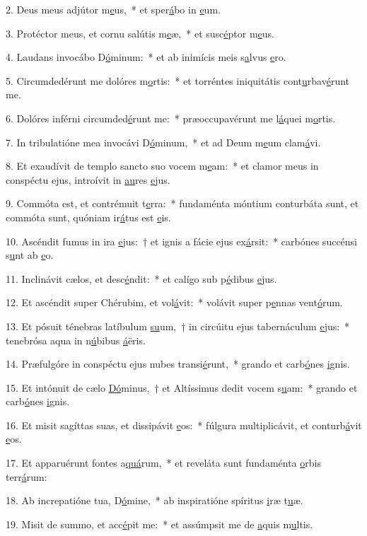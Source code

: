 2. Deus meus adjútor m\uline{e}us,~* et sper\uline{á}bo in \uline{e}um.\par 
3. Protéctor meus, et cornu salútis m\uline{e}æ,~* et susc\uline{é}ptor m\uline{e}us.\par 
4. Laudans invocábo D\uline{ó}minum:~* et ab inimícis meis s\uline{a}lvus \uline{e}ro.\par 
5. Circumdedérunt me dolóres m\uline{o}rtis:~* et torréntes iniquitátis cont\uline{u}rbav\uline{é}runt me.\par 
6. Dolóres inférni circumded\uline{é}runt me:~* præoccupavérunt me l\uline{á}quei m\uline{o}rtis.\par 
7. In tribulatióne mea invocávi D\uline{ó}minum,~* et ad Deum m\uline{e}um clam\uline{á}vi.\par 
8. Et exaudívit de templo sancto suo vocem m\uline{e}am:~* et clamor meus in conspéctu ejus, introívit in \uline{au}res \uline{e}jus.\par 
9. Commóta est, et contrémuit t\uline{e}rra:~* fundaménta móntium conturbáta sunt, et commóta sunt, quóniam ir\uline{á}tus est \uline{e}is.\par 
10. Ascéndit fumus in ira \uline{e}jus:~† et ignis a fácie ejus ex\uline{á}rsit:~* carbónes succénsi s\uline{u}nt ab \uline{e}o.\par 
11. Inclinávit cælos, et desc\uline{é}ndit:~* et calígo sub p\uline{é}dibus \uline{e}jus.\par 
12. Et ascéndit super Chérubim, et vol\uline{á}vit:~* volávit super p\uline{e}nnas vent\uline{ó}rum.\par 
13. Et pósuit ténebras latíbulum \uline{su}um,~† in circúitu ejus tabernáculum \uline{e}jus:~* tenebrósa aqua in n\uline{ú}bibus \uline{á}ëris.\par 
14. Præfulgóre in conspéctu ejus nubes transi\uline{é}runt,~* grando et carb\uline{ó}nes \uline{i}gnis.\par 
15. Et intónuit de cælo \uline{Dó}minus,~† et Altíssimus dedit vocem s\uline{u}am:~* grando et carb\uline{ó}nes \uline{i}gnis.\par 
16. Et misit sagíttas suas, et dissipávit \uline{e}os:~* fúlgura multiplicávit, et conturb\uline{á}vit \uline{e}os.\par 
17. Et apparuérunt fontes a\uline{quá}rum,~* et reveláta sunt fundaménta \uline{o}rbis terr\uline{á}rum:\par 
18. Ab increpatióne tua, D\uline{ó}mine,~* ab inspiratióne spíritus \uline{i}ræ t\uline{u}æ.\par 
19. Misit de summo, et acc\uline{é}pit me:~* et assúmpsit me de \uline{a}quis m\uline{u}ltis.\par 
